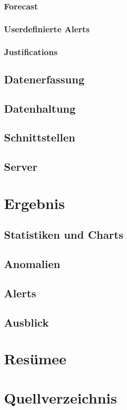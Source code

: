 \documentclass[pdftex,11pt,a4paper]{book}
\begin{document}
\subsection{Forecast}
\subsection{Userdefinierte Alerts}
\subsection{Justifications}
\section{Datenerfassung}
\section{Datenhaltung}
\section{Schnittstellen}
\section{Server}


\chapter{Ergebnis}
\section{Statistiken und Charts}
\section{Anomalien}
\section{Alerts}
\section{Ausblick}

\chapter{Resümee}


\chapter{Quellverzeichnis}
\end{document}
